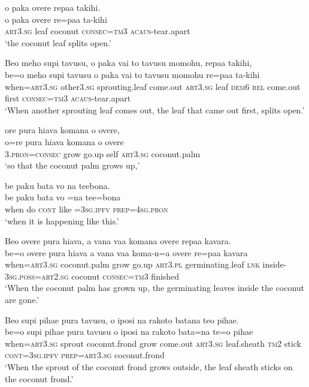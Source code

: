 \ea\label{ex:text01-20}
o paka overe repaa takihi.\\
\gll o	paka	overe	re=paa	ta-kihi\\
     \textsc{art}3.\textsc{sg}	leaf	coconut	\textsc{consec}=\textsc{tm}3	\textsc{acaus}-tear.apart\\
\glt `the coconut leaf splits open.'
\z

\ea\label{ex:text01-21}
Beo meho supi tavusu, o paka vai to tavusu momohu, repaa takihi,\\
\gll be=o	meho	supi	tavusu	o	paka	vai	to	tavusu	momohu	re=paa	ta-kihi\\
     when=\textsc{art}3.\textsc{sg}	other3.\textsc{sg}	sprouting.leaf	come.out	\textsc{art}3.\textsc{sg}	leaf	\textsc{dem}6	\textsc{rel}	come.out	first	\textsc{consec}=\textsc{tm}3	\textsc{acaus}-tear.apart\\
\glt `When another sprouting leaf comes out, the leaf that came out first, splits open.'
\z

\ea\label{ex:text01-22}
ore pura hiava komana o overe,\\
\gll o=re	pura	hiava	komana	o	overe\\
     3.\textsc{pron}=\textsc{consec}	grow	go.up	self	\textsc{art}3.\textsc{sg}	coconut.palm\\
\glt `so that the coconut palm grows up,'
\z

\ea\label{ex:text01-23}
be paku bata vo na teebona.\\
\gll be	paku	bata	vo	=na	tee=bona\\
     when	do	\textsc{cont}	like	=3\textsc{sg}.\textsc{ipfv}	\textsc{prep}=4\textsc{sg}.\textsc{pron}\\
\glt `when it is happening like this.'
\z

\ea\label{ex:text01-24}
Beo overe pura hiava, a vana vaa komana overe repaa kavara.\\
\gll be=o	overe	pura	hiava	a	vana	vaa	koma-n=a	overe	re=paa	kavara\\
     when=\textsc{art}3.\textsc{sg}	coconut.palm	grow	go.up	\textsc{art}3.\textsc{pl}	germinating.leaf	\textsc{lnk}	inside-3\textsc{sg}.\textsc{poss}=\textsc{art}2.\textsc{sg}	coconut	\textsc{consec}=\textsc{tm}3	finished\\
\glt `When the coconut palm has grown up, the germinating leaves inside the coconut are gone.'
\z

\ea\label{ex:text01-25}
Beo supi pihae pura tavusu, o iposi na rakoto batana teo pihae.\\
\gll be=o	supi	pihae	pura	tavusu	o	iposi	na	rakoto	bata=na	te=o	pihae\\
     when=\textsc{art}3.\textsc{sg}	sprout	coconut.frond	grow	come.out	\textsc{art}3.\textsc{sg}	leaf.sheath	\textsc{tm}2	stick	\textsc{cont}=3\textsc{sg}.\textsc{ipfv}	\textsc{prep}=\textsc{art}3.\textsc{sg}	coconut.frond\\
\glt `When the sprout of the coconut frond grows outside, the leaf sheath sticks on the coconut frond.'
\z

